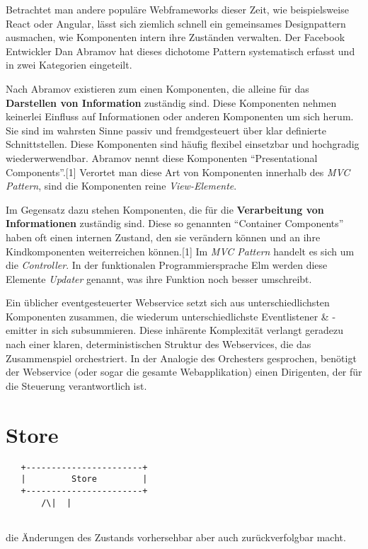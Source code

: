 \documentclass[]{assets/latex/ieee}
\begin{document}
Betrachtet man andere populäre Webframeworks dieser Zeit, wie
beispielsweise React oder Angular, lässt sich ziemlich schnell ein
gemeinsames Designpattern ausmachen, wie Komponenten intern ihre
Zuständen verwalten. Der Facebook Entwickler Dan Abramov hat dieses
dichotome Pattern systematisch erfasst und in zwei Kategorien
eingeteilt.

Nach Abramov existieren zum einen Komponenten, die alleine für das
\textbf{Darstellen von Information} zuständig sind. Diese Komponenten
nehmen keinerlei Einfluss auf Informationen oder anderen Komponenten um
sich herum. Sie sind im wahrsten Sinne passiv und fremdgesteuert über
klar definierte Schnittstellen. Diese Komponenten sind häufig flexibel
einsetzbar und hochgradig wiederwerwendbar. Abramov nennt diese
Komponenten ``Presentational Components''.{[}1{]} Verortet man diese Art
von Komponenten innerhalb des \emph{MVC Pattern}, sind die Komponenten
reine \emph{View-Elemente}.

Im Gegensatz dazu stehen Komponenten, die für die \textbf{Verarbeitung
von Informationen} zuständig sind. Diese so genannten ``Container
Components'' haben oft einen internen Zustand, den sie verändern können
und an ihre Kindkomponenten weiterreichen können.{[}1{]} Im \emph{MVC
Pattern} handelt es sich um die \emph{Controller}. In der funktionalen
Programmiersprache Elm werden diese Elemente \emph{Updater} genannt, was
ihre Funktion noch besser umschreibt.

Ein üblicher eventgesteuerter Webservice setzt sich aus
unterschiedlichsten Komponenten zusammen, die wiederum
unterschiedlichste Eventlistener \& -emitter in sich subsummieren. Diese
inhärente Komplexität verlangt geradezu nach einer klaren,
deterministischen Struktur des Webservices, die das Zusammenspiel
orchestriert. In der Analogie des Orchesters gesprochen, benötigt der
Webservice (oder sogar die gesamte Webapplikation) einen Dirigenten, der
für die Steuerung verantwortlich ist.

\section{Store}\label{store}

\begin{verbatim}
   +-----------------------+
   |         Store         |
   +-----------------------+
       /\|  |
       
\end{verbatim}

die Änderungen des Zustands vorhersehbar aber auch zurückverfolgbar
macht.
\end{document}
